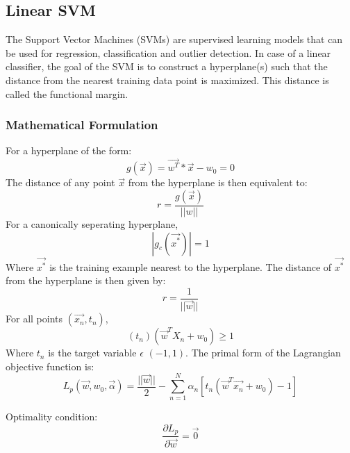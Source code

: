 \documentclass[11pt,a4paper]{article}
\newcommand{\noi}{\noindent}
\begin{document}
\subsection{Linear SVM}

\label{subsection:1A_svm}
The Support Vector Machines (SVMs) are supervised learning models that can be used for regression, classification and outlier detection. In case of a linear classifier, the goal of the SVM is to construct a hyperplane(s) such that the distance from the nearest training data point is maximized. This distance is called the functional margin.  


\subsubsection{Mathematical Formulation}
\noindent
For a hyperplane of the form:
\begin{equation}
    g(\vec{x})=\vec{w^{T}}*\vec{x}-w_{0}=0
\end{equation}
\noi
The distance of any point $\vec{x}$ from the hyperplane is then equivalent to: 
\begin{equation}
    r=\frac{g(\vec{x})}{||w||}
\end{equation}
\noi
For a canonically seperating hyperplane, 
\begin{equation}
    |g_c(\vec{x^*})|=1
\end{equation}
\noi
Where $\vec{x^*}$ is the training example nearest to the hyperplane. 
The distance of $\vec{x^*}$ from the hyperplane is then given by:
\begin{equation}
    r=\frac{1}{||\vec{w}||}
\end{equation}
\noi
For all points $(\vec{x_n},t_n)$, 
\begin{equation}
    (t_n)(\vec{w}^{T}X_n+w_0) \geq 1
\end{equation}
\noi
Where $t_n$ is the target variable $\epsilon$ $(-1,1)$.
\noi
The primal form of the Lagrangian objective function is:
\begin{equation}
    L_p(\vec{w},w_0,\vec{\alpha})=\frac{||\vec{w}||}{2}-\sum_{n=1}^{N}\alpha_n[t_n(\vec{w}^T\vec{x_n}+w_0)-1]
\end{equation}

\noi
Optimality condition:
\begin{equation}
    \frac{\partial L_p}{\partial \vec{w}}=\vec{0}
\end{equation}
\end{document}
